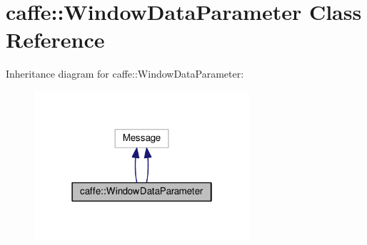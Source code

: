 \hypertarget{classcaffe_1_1_window_data_parameter}{}\section{caffe\+:\+:Window\+Data\+Parameter Class Reference}
\label{classcaffe_1_1_window_data_parameter}


Inheritance diagram for caffe\+:\+:Window\+Data\+Parameter\+:
\nopagebreak
\begin{figure}[H]
\begin{center}
\leavevmode
\includegraphics[width=226pt]{classcaffe_1_1_window_data_parameter__inherit__graph}
\end{center}
\end{figure}
